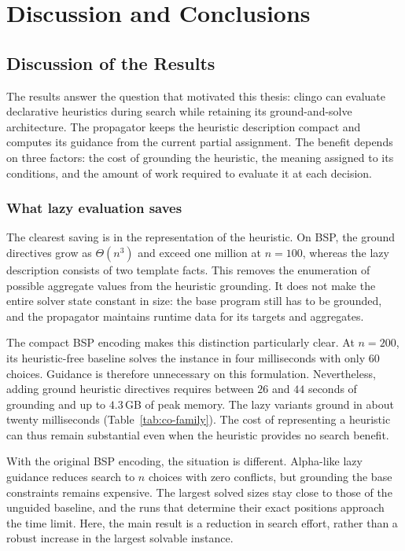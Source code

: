 \chapter{Discussion and Conclusions}
\label{sec:discussion}

\begingroup
\setlength{\parskip}{0.4em}

\section{Discussion of the Results}

The results answer the question that motivated this thesis: clingo can evaluate declarative heuristics during search while retaining its ground-and-solve architecture. The propagator keeps the heuristic description compact and computes its guidance from the current partial assignment. The benefit depends on three factors: the cost of grounding the heuristic, the meaning assigned to its conditions, and the amount of work required to evaluate it at each decision.

\subsection{What lazy evaluation saves}

The clearest saving is in the representation of the heuristic. On BSP, the ground directives grow as $\Theta(n^3)$ and exceed one million at $n=100$, whereas the lazy description consists of two template facts. This removes the enumeration of possible aggregate values from the heuristic grounding. It does not make the entire solver state constant in size: the base program still has to be grounded, and the propagator maintains runtime data for its targets and aggregates.

The compact BSP encoding makes this distinction particularly clear. At $n=200$, its heuristic-free baseline solves the instance in four milliseconds with only $60$ choices. Guidance is therefore unnecessary on this formulation. Nevertheless, adding ground heuristic directives requires between $26$ and $44$ seconds of grounding and up to $4.3$\,GB of peak memory. The lazy variants ground in about twenty milliseconds (Table~\ref{tab:co-family}). The cost of representing a heuristic can thus remain substantial even when the heuristic provides no search benefit.

With the original BSP encoding, the situation is different. Alpha-like lazy guidance reduces search to $n$ choices with zero conflicts, but grounding the base constraints remains expensive. The largest solved sizes stay close to those of the unguided baseline, and the runs that determine their exact positions approach the time limit. Here, the main result is a reduction in search effort, rather than a robust increase in the largest solvable instance.

